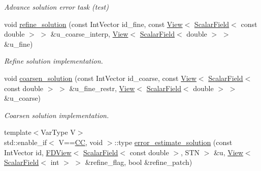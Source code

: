 \begin{DoxyCompactItemize}
\begin{DoxyCompactList}\small\item\em Advance solution error task (test) \end{DoxyCompactList}\item 
void \hyperlink{classUintah_1_1PhaseField_1_1Heat_a54b3c4c823e1f91c69df249ba1771089}{refine\+\_\+solution} (const Int\+Vector id\+\_\+fine, const \hyperlink{namespaceUintah_1_1PhaseField_a59210a1e28eba254d428762c92ddeabb}{View}$<$ \hyperlink{structUintah_1_1PhaseField_1_1ScalarField}{Scalar\+Field}$<$ const double $>$ $>$ \&u\+\_\+coarse\+\_\+interp, \hyperlink{namespaceUintah_1_1PhaseField_a59210a1e28eba254d428762c92ddeabb}{View}$<$ \hyperlink{structUintah_1_1PhaseField_1_1ScalarField}{Scalar\+Field}$<$ double $>$ $>$ \&u\+\_\+fine)
\begin{DoxyCompactList}\small\item\em Refine solution implementation. \end{DoxyCompactList}\item 
void \hyperlink{classUintah_1_1PhaseField_1_1Heat_aeb00a7f9aec85898020c405a40c9dcb8}{coarsen\+\_\+solution} (const Int\+Vector id\+\_\+coarse, const \hyperlink{namespaceUintah_1_1PhaseField_a59210a1e28eba254d428762c92ddeabb}{View}$<$ \hyperlink{structUintah_1_1PhaseField_1_1ScalarField}{Scalar\+Field}$<$ const double $>$ $>$ \&u\+\_\+fine\+\_\+restr, \hyperlink{namespaceUintah_1_1PhaseField_a59210a1e28eba254d428762c92ddeabb}{View}$<$ \hyperlink{structUintah_1_1PhaseField_1_1ScalarField}{Scalar\+Field}$<$ double $>$ $>$ \&u\+\_\+coarse)
\begin{DoxyCompactList}\small\item\em Coarsen solution implementation. \end{DoxyCompactList}\item 
{\footnotesize template$<$Var\+Type V$>$ }\\std\+::enable\+\_\+if$<$ V==\hyperlink{namespaceUintah_1_1PhaseField_a33d355affda78a83f45755ba8388cedda22303704507d024d1d6508ed9859a85a}{CC}, void $>$\+::type \hyperlink{classUintah_1_1PhaseField_1_1Heat_a598fb08265f2f7ddb687b2a663e5e203}{error\+\_\+estimate\+\_\+solution} (const Int\+Vector id, \hyperlink{namespaceUintah_1_1PhaseField_a63032464b1cd54eaa53c1c29109746ac}{F\+D\+View}$<$ \hyperlink{structUintah_1_1PhaseField_1_1ScalarField}{Scalar\+Field}$<$ const double $>$, S\+TN $>$ \&u, \hyperlink{namespaceUintah_1_1PhaseField_a59210a1e28eba254d428762c92ddeabb}{View}$<$ \hyperlink{structUintah_1_1PhaseField_1_1ScalarField}{Scalar\+Field}$<$ int $>$ $>$ \&refine\+\_\+flag, bool \&refine\+\_\+patch)

\end{DoxyCompactItemize}
